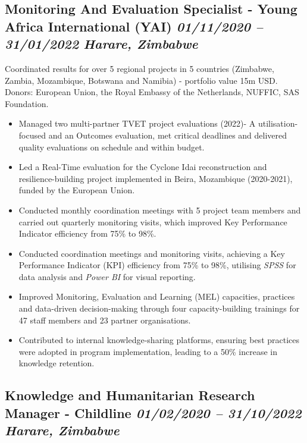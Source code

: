 \documentclass[
  10pt,
]{article}
\providecommand{\tightlist}{%
  \setlength{\itemsep}{0pt}\setlength{\parskip}{0pt}}
\begin{document}
\subsection{\texorpdfstring{Monitoring And Evaluation Specialist - Young
Africa International (YAI) \emph{01/11/2020 -- 31/01/2022} \textbar{}
\emph{Harare, Zimbabwe}}{Monitoring And Evaluation Specialist - Young Africa International (YAI) 01/11/2020 -- 31/01/2022 \textbar{} Harare, Zimbabwe}}\label{monitoring-and-evaluation-specialist---young-africa-international-yai-01112020-31012022-harare-zimbabwe}

Coordinated results for over 5 regional projects in 5 countries (Zimbabwe, Zambia, Mozambique, Botswana and Namibia) - portfolio value 15m USD. Donors: European Union, the Royal Embassy of the Netherlands, NUFFIC, SAS Foundation.

\begin{itemize}
\tightlist
\item
Managed two multi-partner TVET project evaluations (2022)- A utilisation-focused and an Outcomes evaluation, met critical deadlines and delivered quality evaluations on schedule and within budget.
\item
Led a Real-Time evaluation for the Cyclone Idai reconstruction and resilience-building project implemented in Beira, Mozambique (2020-2021), funded by the European Union.
\item
Conducted monthly coordination meetings with 5 project team members and carried out quarterly monitoring visits, which improved Key Performance Indicator efficiency from 75\% to 98\%.
\item
Conducted coordination meetings and monitoring visits, achieving a Key Performance Indicator (KPI) efficiency from 75\% to 98\%, utilising \emph{SPSS} for data analysis and \emph{Power BI} for visual reporting.
\item
Improved Monitoring, Evaluation and Learning (MEL) capacities, practices and data-driven decision-making through four capacity-building trainings for 47 staff members and 23 partner organisations.
\item
Contributed to internal knowledge-sharing platforms, ensuring best practices were adopted in program implementation, leading to a 50\% increase in knowledge retention.
\end{itemize}

\subsection{\texorpdfstring{Knowledge and Humanitarian Research Manager - Childline \emph{01/02/2020 -- 31/10/2022} \textbar{} \emph{Harare, Zimbabwe}}{Knowledge and Humanitarian Research Manager - Childline 01/02/2020 -- 31/10/2022 \textbar{} Harare, Zimbabwe}}\label{knowledge-and-humanitarian-research-manager---childline-01022020-31102022-harare-zimbabwe}
\end{document}

